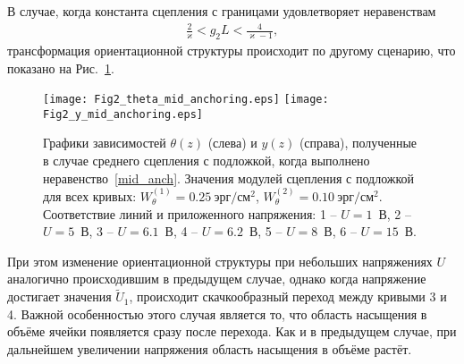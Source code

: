 В случае, когда константа сцепления с границами удовлетворяет неравенствам
\begin{align}\label{mid_anch}
\frac{2}{\varkappa}< g_2L < \frac{4}{\varkappa - 1},
\end{align}
трансформация ориентационной структуры происходит по другому сценарию, что показано на Рис.~\ref{ch5:fig2}.
\begin{figure}[h]
	\texttt{[image: Fig2\_theta\_mid\_anchoring.eps]}\hspace{2pc}%
	\texttt{[image: Fig2\_y\_mid\_anchoring.eps]}
	\caption{Графики зависимостей $\theta(z)$ (слева) и $y(z)$ (справа), полученные в случае среднего сцепления с подложкой, когда выполнено неравенство~\eqref{mid_anch}.
		Значения модулей сцепления с подложкой для всех кривых: $W_\theta^{(1)}=0.25\ \text{эрг}/\text{см}^2$, $W_\theta^{(2)} = 0.10\ \text{эрг}/\text{см}^2$.
		Соответствие линий и приложенного напряжения: 1 -- $U = 1$~В, 2 -- $U = 5$~В, 3 -- $U = 6.1$~В, 4 -- $U = 6.2$~В, 5 -- $U = 8$~В, 6 -- $U = 15$~В.}\label{ch5:fig2}
\end{figure}
При этом изменение ориентационной структуры при небольших напряжениях $U$ аналогично происходившим в предыдущем случае, однако когда напряжение достигает значения $\widetilde{U}_1$, происходит скачкообразный переход между кривыми 3 и 4.
Важной особенностью этого случая является то, что область насыщения в объёме ячейки появляется сразу после перехода.
Как и в предыдущем случае, при дальнейшем увеличении напряжения область насыщения в объёме растёт.



